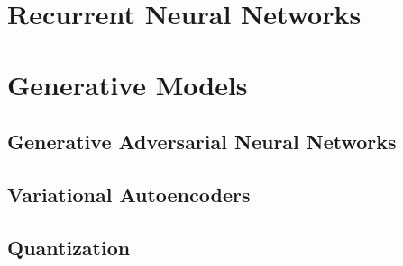 \documentclass{article}
\begin{document}
\section{Recurrent Neural Networks}

\section{Generative Models}

\subsection{Generative Adversarial Neural Networks}

\subsection{Variational Autoencoders}

\subsection{Quantization}




\end{document}
